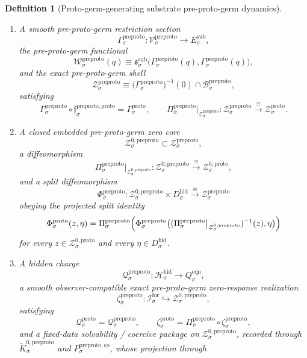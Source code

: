 \documentclass[11pt]{article}
\newcommand{\ForSpace}[1]{\mathcal I_{#1}^{\mathrm{for}}}
\newcommand{\SubTarget}[1]{E_{#1}^{\mathrm{sub}}}
\newcommand{\SubPair}[1]{\mathfrak s_{#1}^{\mathrm{sub}}}
\newcommand{\EqnTarget}[1]{Q_{#1}^{\mathrm{eqn}}}
\newcommand{\HiddenSpace}[1]{\mathcal H_{#1}^{\mathrm{hid}}}
\newcommand{\HiddenBody}[1]{D_{#1}^{\mathrm{hid}}}
\newcommand{\ProtoOrigMin}[1]{\mathfrak f_{#1}^{\mathrm{proto,orig}}}
\newcommand{\ProtoPrecMin}[1]{\mathfrak f_{#1}^{\mathrm{proto,prec}}}
\newcommand{\ProtoLiftMin}[1]{\mathfrak f_{#1}^{\mathrm{proto,lift}}}
\newcommand{\ProtoSubMin}[1]{\mathfrak m_{#1}^{\mathrm{proto}}}
\newcommand{\ProtoSection}[1]{\Gamma_{#1}^{\mathrm{proto}}}
\newcommand{\ProtoShellSet}[1]{\mathcal Z_{#1}^{\mathrm{proto}}}
\newcommand{\ProtoZeroCore}[1]{\mathcal Z_{#1}^{0,\mathrm{proto}}}
\newcommand{\ProtoSplit}[1]{\Phi_{#1}^{\mathrm{proto}}}
\newcommand{\ProtoCharge}[1]{\mathcal Q_{#1}^{\mathrm{proto}}}
\newcommand{\ProtoEmbed}[1]{\zeta_{#1}^{\mathrm{proto}}}
\newcommand{\PreProtoSpace}[1]{\mathcal V_{#1}^{\mathrm{preproto}}}
\newcommand{\PreProtoBody}[1]{\mathcal B_{#1}^{\mathrm{preproto}}}
\newcommand{\PreProtoProj}[1]{\Pi_{#1}^{\mathrm{preproto}}}
\newcommand{\PreProtoProtoMin}[1]{\mathfrak f_{#1}^{\mathrm{preproto,proto}}}
\newcommand{\PreProtoPrecMin}[1]{\mathfrak f_{#1}^{\mathrm{preproto,prec}}}
\newcommand{\PreProtoLiftMin}[1]{\mathfrak f_{#1}^{\mathrm{preproto,lift}}}
\newcommand{\PreProtoSubMin}[1]{\mathfrak m_{#1}^{\mathrm{preproto}}}
\newcommand{\PreProtoSection}[1]{\Gamma_{#1}^{\mathrm{preproto}}}
\newcommand{\PreProtoFunctional}[1]{\mathscr W_{#1}^{\mathrm{preproto}}}
\newcommand{\PreProtoShellSet}[1]{\mathcal Z_{#1}^{\mathrm{preproto}}}
\newcommand{\PreProtoZeroCore}[1]{\mathcal Z_{#1}^{0,\mathrm{preproto}}}
\newcommand{\PreProtoSplit}[1]{\Phi_{#1}^{\mathrm{preproto}}}
\newcommand{\PreProtoCharge}[1]{\mathcal Q_{#1}^{\mathrm{preproto}}}
\newcommand{\PreProtoEmbed}[1]{\zeta_{#1}^{\mathrm{preproto}}}
\newcommand{\PreProtoKernelCh}[1]{\widetilde K_{#1}^{0,\mathrm{preproto}}}
\newcommand{\PreProtoStateComp}[1]{P_{#1}^{\mathrm{preproto,co}}}
\newtheorem{definition}{Definition}
\begin{document}
\begin{definition}[Proto-germ-generating substrate pre-proto-germ dynamics]
\begin{enumerate}
\[    =
    \ProtoOrigMin{\sigma},
    \qquad
    \PreProtoProj{\sigma}\circ\PreProtoPrecMin{\sigma}
    =
    \ProtoPrecMin{\sigma},
    \]
    \[
    \PreProtoProj{\sigma}\circ\PreProtoLiftMin{\sigma}
    =
    \ProtoLiftMin{\sigma},
    \qquad
    \PreProtoProj{\sigma}\circ\PreProtoSubMin{\sigma}
    =
    \ProtoSubMin{\sigma}.
    \]
    \item A smooth pre-proto-germ restriction section
    \[
    \PreProtoSection{\sigma}:\PreProtoSpace{\sigma}\to\SubTarget{\sigma},
    \]
    the pre-proto-germ functional
    \[
    \PreProtoFunctional{\sigma}(q)
    \equiv
    \SubPair{\sigma}\bigl(\PreProtoSection{\sigma}(q),\PreProtoSection{\sigma}(q)\bigr),
    \]
    and the exact pre-proto-germ shell
    \[
    \PreProtoShellSet{\sigma}
    \equiv
    \bigl(\PreProtoSection{\sigma}\bigr)^{-1}(0)\cap\PreProtoBody{\sigma},
    \]
    satisfying
    \[
    \PreProtoSection{\sigma}\circ\PreProtoProtoMin{\sigma}
    =
    \ProtoSection{\sigma},
    \qquad
    \PreProtoProj{\sigma}\big|_{\PreProtoShellSet{\sigma}}
    :
    \PreProtoShellSet{\sigma}
    \xrightarrow{\cong}
    \ProtoShellSet{\sigma}.
    \]
    \item A closed embedded pre-proto-germ zero core
    \[
    \PreProtoZeroCore{\sigma}\subset\PreProtoShellSet{\sigma},
    \]
    a diffeomorphism
    \[
    \PreProtoProj{\sigma}\big|_{\PreProtoZeroCore{\sigma}}
    :
    \PreProtoZeroCore{\sigma}
    \xrightarrow{\cong}
    \ProtoZeroCore{\sigma},
    \]
    and a split diffeomorphism
    \[
    \PreProtoSplit{\sigma}:
    \PreProtoZeroCore{\sigma}\times\HiddenBody{\sigma}
    \xrightarrow{\cong}
    \PreProtoShellSet{\sigma}
    \]
    obeying the projected split identity
    \[
    \ProtoSplit{\sigma}(z,\eta)
    =
    \PreProtoProj{\sigma}\Bigl(
    \PreProtoSplit{\sigma}\bigl(
    (\PreProtoProj{\sigma}\big|_{\PreProtoZeroCore{\sigma}})^{-1}(z),\eta
    \bigr)\Bigr)
    \]
    for every \(z\in\ProtoZeroCore{\sigma}\) and every \(\eta\in\HiddenBody{\sigma}\).
    \item A hidden charge
    \[
    \PreProtoCharge{\sigma}:\HiddenSpace{\sigma}\to\EqnTarget{\sigma},
    \]
    a smooth observer-compatible exact pre-proto-germ zero-response realization
    \[
    \PreProtoEmbed{\sigma}:\ForSpace{\sigma}\hookrightarrow\PreProtoZeroCore{\sigma},
    \]
    satisfying
    \[
    \ProtoCharge{\sigma}
    =
    \PreProtoCharge{\sigma},
    \qquad
    \ProtoEmbed{\sigma}
    =
    \PreProtoProj{\sigma}\circ\PreProtoEmbed{\sigma},
    \]
    and a fixed-data solvability / coercive package on \(\PreProtoZeroCore{\sigma}\), recorded through \(\PreProtoKernelCh{\sigma}\) and \(\PreProtoStateComp{\sigma}\), whose projection through

\end{enumerate}
\end{definition}
\end{document}
